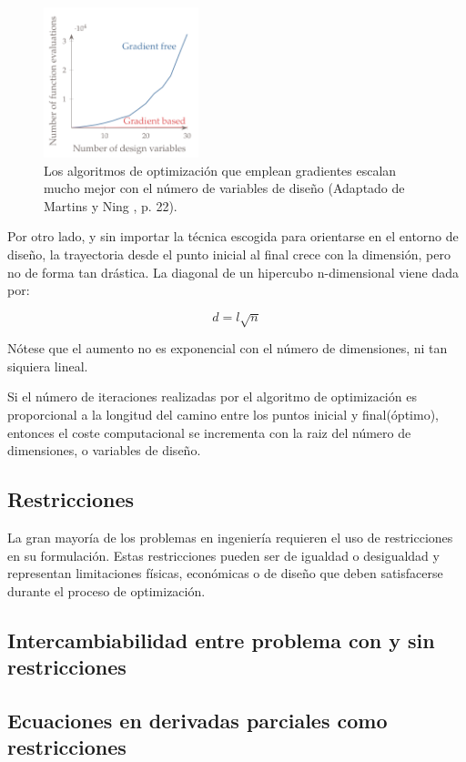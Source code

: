\begin{figure}[h]
    \centering
    \includegraphics[width=0.4\textwidth]{./capitulos/metodologia/images/gradient_based_vs_gradient_free.png}
    \caption{Los algoritmos de optimización que emplean gradientes escalan mucho mejor con el número de variables de diseño (Adaptado de Martins y Ning \cite{mdobook}, p. 22).}
    \label{fig:gradient_based_vs_gradient_free}
\end{figure}



Por otro lado, y sin importar la técnica escogida para orientarse en el entorno
de diseño, la trayectoria desde el punto inicial al final crece con la
dimensión, pero no de forma tan drástica. La diagonal de un hipercubo
n-dimensional viene dada por:

\begin{equation}
	d = l\sqrt{n}
\end{equation}

Nótese que el aumento no es exponencial con el número de dimensiones, ni tan
siquiera lineal.

Si el número de iteraciones realizadas por el algoritmo de optimización es
proporcional a la longitud del camino entre los puntos inicial y final(óptimo),
entonces el coste computacional se incrementa con la raiz del número de
dimensiones, o variables de diseño.

\subsection{Restricciones}

La gran mayoría de los problemas en ingeniería requieren el uso de
restricciones en su formulación. Estas restricciones pueden ser de igualdad o
desigualdad y representan limitaciones físicas, económicas o de diseño que
deben satisfacerse durante el proceso de optimización.

\subsection{Intercambiabilidad entre problema con y sin restricciones}

\subsection{Ecuaciones en derivadas parciales como restricciones}
